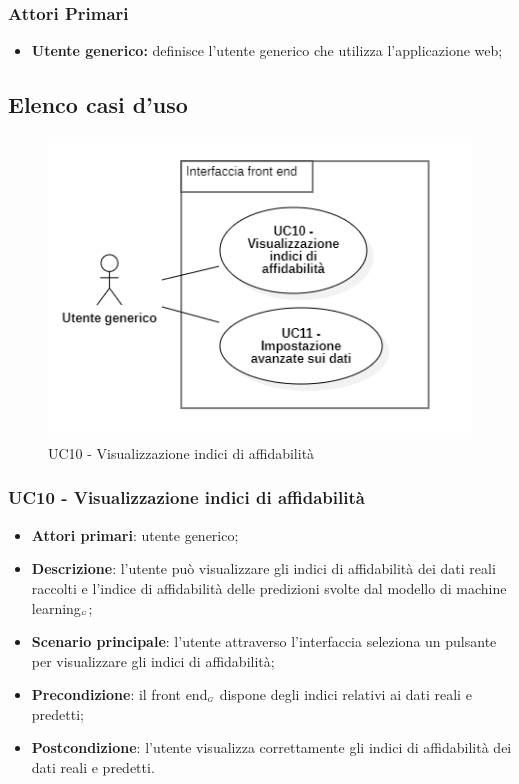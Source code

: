 \subsubsection{Attori Primari}\label{UFattoriPrimariFac}
\begin{itemize}
	\item \textbf{Utente generico:} definisce l'utente generico che utilizza l'applicazione web;
\end{itemize}

\subsection{Elenco casi d'uso}\label{CasiDUsoCasiDUsoFacoltativiTraUnUtenteEIlFrontEndElencoCasiDUso}



\begin{center}
	\begin{figure}[H]
		\centering\includegraphics[scale=0.7]{../immagini/attori_casi/UC10-11.png}
		\caption{UC10 - Visualizzazione indici di affidabilità}
	\end{figure}
\end{center}


\subsubsection{UC10 - Visualizzazione indici di affidabilità}\label{CasiDUsoCasiDUsoFacoltativiTraUnUtenteEIlFrontEndElencoCasiDUsoUC10VisualizzazioneIndiciDiAffidabilita}


\begin{itemize}
	\item \textbf{Attori primari}: utente generico;
	\item \textbf{Descrizione}: l'utente può visualizzare gli indici di affidabilità dei dati reali raccolti e l'indice di affidabilità delle predizioni svolte dal modello di machine learning$_{\scaleto{G}{3pt}}$;
	\item \textbf{Scenario principale}: l'utente attraverso l'interfaccia seleziona un pulsante per visualizzare gli indici di affidabilità;
	\item \textbf{Precondizione}: il front end$_{\scaleto{G}{3pt}}$ dispone degli indici relativi ai dati reali e predetti;
	\item \textbf{Postcondizione}: l'utente visualizza correttamente gli indici di affidabilità dei dati reali e predetti.
\end{itemize}

